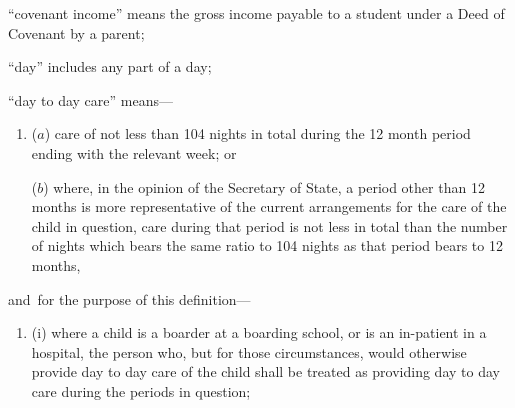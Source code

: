 \documentclass[12pt,a4paper]{article}
\begin{document}
\begin{enumerate}
“covenant income” means the gross income payable to a student under a Deed of Covenant by a parent;

“day” includes any part of a day;

%

“day to day care” means—
\begin{enumerate}\item[]
($a$) care of not less than 104 nights in total during the 12 month period ending with the relevant week; or

($b$) where, in the opinion of the 
Secretary of State, a period other than 12 months  %
is more representative of the current arrangements for the care of the child in question, care during that period is not less in total than the number of nights which bears the same ratio to 104 nights as that period bears to 12 months,
\end{enumerate}
and~for the purpose of this definition—
\begin{enumerate}\item[]
(i) where a child is a boarder at a boarding school, or is an in-patient in a hospital, the person who, but for those circumstances, would otherwise provide day to day care of the child shall be treated as providing day to day care during the periods in question;



\end{enumerate}
\end{enumerate}
\end{document}
